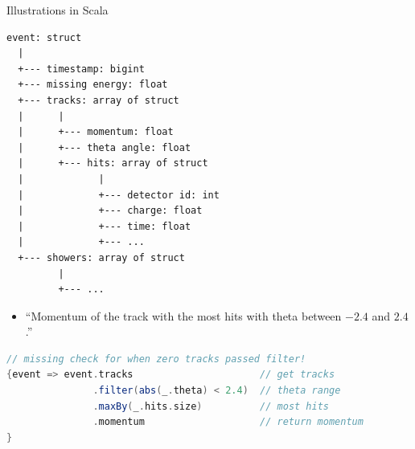 \documentclass{beamer}
\begin{document}
\begin{frame}[fragile]{Illustrations in Scala}
\vspace{0.25 cm}
{\tiny
\begin{verbatim}
event: struct
  |
  +--- timestamp: bigint
  +--- missing energy: float
  +--- tracks: array of struct
  |      |
  |      +--- momentum: float
  |      +--- theta angle: float
  |      +--- hits: array of struct
  |             |
  |             +--- detector id: int
  |             +--- charge: float
  |             +--- time: float
  |             +--- ...
  +--- showers: array of struct
         |
         +--- ...
\end{verbatim}}

\begin{itemize}
\item ``Momentum of the track with the most hits with theta between $-2.4$ and $2.4$.''
\end{itemize}

\begin{lstlisting}[language=scala]
// missing check for when zero tracks passed filter!
{event => event.tracks                      // get tracks
               .filter(abs(_.theta) < 2.4)  // theta range
               .maxBy(_.hits.size)          // most hits
               .momentum                    // return momentum
}
\end{lstlisting}
\end{frame}
\end{document}
